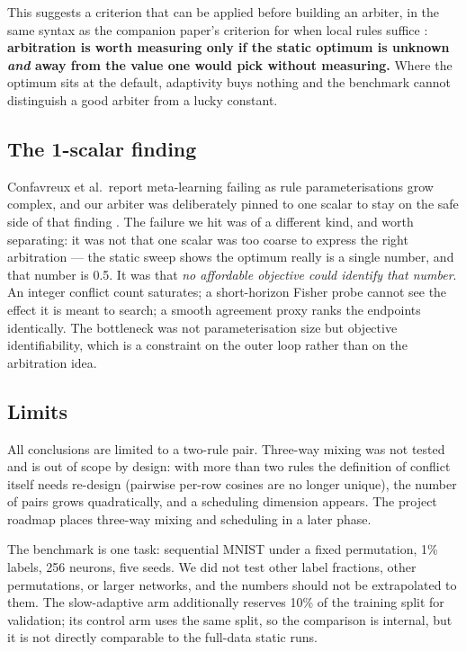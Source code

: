 \documentclass[11pt]{article}
\begin{document}
This suggests a criterion that can be applied before building an arbiter, in the same syntax as
the companion paper's criterion for when local rules suffice \citep{biosnnplug2026}: \textbf{arbitration is worth measuring only if the
static optimum is unknown \emph{and} away from the value one would pick without measuring.} Where
the optimum sits at the default, adaptivity buys nothing and the benchmark cannot distinguish a
good arbiter from a lucky constant.

\subsection{The 1-scalar finding}

Confavreux et al.\ report meta-learning failing as rule parameterisations grow complex, and our
arbiter was deliberately pinned to one scalar to stay on the safe side of that finding
\citep{confavreux2025}. The failure we hit was of a different kind, and worth separating: it was
not that one scalar was too coarse to express the right arbitration --- the static sweep shows the
optimum really is a single number, and that number is 0.5. It was that \emph{no affordable
objective could identify that number}. An integer conflict count saturates; a short-horizon Fisher
probe cannot see the effect it is meant to search; a smooth agreement proxy ranks the endpoints
identically. The bottleneck was not parameterisation size but objective identifiability, which is a
constraint on the outer loop rather than on the arbitration idea.

\subsection{Limits}

All conclusions are limited to a two-rule pair. Three-way mixing was not tested and is out of
scope by design: with more than two rules the definition of conflict itself needs re-design (pairwise
per-row cosines are no longer unique), the number of pairs grows quadratically, and a scheduling
dimension appears. The project roadmap places three-way mixing and scheduling in a later phase.

The benchmark is one task: sequential MNIST under a fixed permutation, 1\% labels, 256 neurons,
five seeds. We did not test other label fractions, other permutations, or larger networks, and the
numbers should not be extrapolated to them. The slow-adaptive arm additionally reserves 10\% of the
training split for validation; its control arm uses the same split, so the comparison is internal,
but it is not directly comparable to the full-data static runs.
\end{document}
